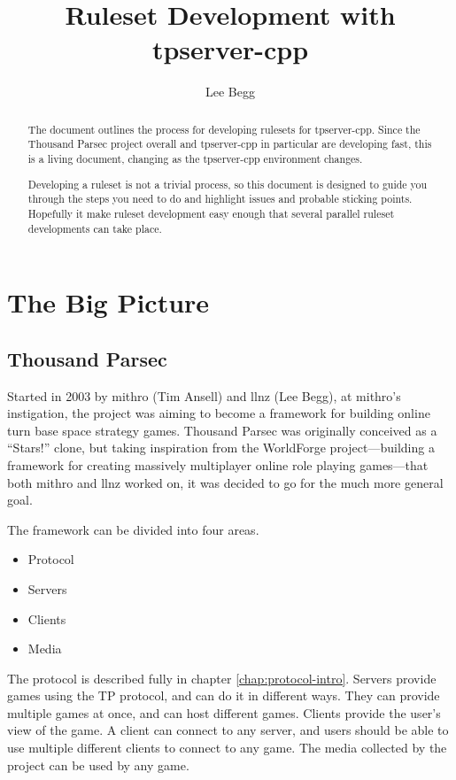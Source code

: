 \documentclass[a4paper,11pt]{report}
\title{Ruleset Development with tpserver-cpp}
\author{Lee Begg}
\begin{document}
\maketitle

\tableofcontents

\begin{abstract}
The document outlines the process for developing rulesets for tpserver-cpp. Since the Thousand Parsec project overall and tpserver-cpp in particular are developing fast, this is a living document, changing as the tpserver-cpp environment changes.

Developing a ruleset is not a trivial process, so this document is designed to guide you through the steps
you need to do and highlight issues and probable sticking points. Hopefully it make ruleset development easy enough that several parallel ruleset developments can take place.
\end{abstract}

\part{The Big Picture}
\label{part:intro}

\chapter{Thousand Parsec}
\label{chap:tp}
Started in 2003 by mithro (Tim Ansell) and llnz (Lee Begg), at mithro's instigation, the project was aiming to become a framework for building online turn base space strategy games. Thousand Parsec was originally conceived as a ``Stars!'' clone, but taking inspiration from the WorldForge project---building a framework for creating massively multiplayer online role playing games---that both mithro and llnz worked on, it was decided to go for the much more general goal.


The framework can be divided into four areas.
\begin{itemize}
 \item Protocol
 \item Servers
 \item Clients
 \item Media
\end{itemize}

The protocol is described fully in chapter \ref{chap:protocol-intro}. Servers provide games using the TP protocol, and can do it in different ways. They can provide multiple games at once, and can host different games. Clients provide the user's view of the game. A client can connect to any server, and users should be able to use multiple different clients to connect to any game. The media collected by the project can be used by any game.
\end{document}
